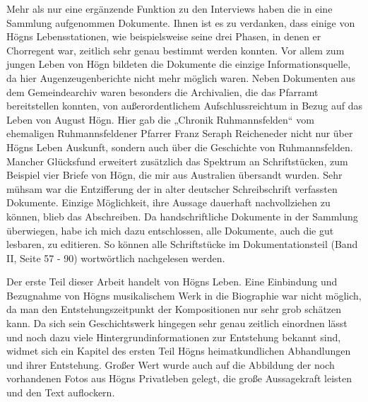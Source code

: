 \documentclass[a4paper]{article}
\newcounter{Abb}
\begin{document}
Mehr als nur eine ergänzende Funktion zu den Interviews haben die in
eine Sammlung aufgenommen Dokumente. Ihnen ist es zu verdanken, dass
einige von Högns Lebensstationen, wie beispielsweise seine drei Phasen,
in denen er Chorregent war, zeitlich sehr genau bestimmt werden
konnten. Vor allem zum jungen Leben von Högn bildeten die Dokumente die
einzige Informationsquelle, da hier Augenzeugenberichte nicht mehr
möglich waren. Neben Dokumenten aus dem Gemeindearchiv waren besonders
die Archivalien, die das Pfarramt bereitstellen konnten, von
außerordentlichem Aufschlussreichtum in Bezug auf das Leben von August
Högn. Hier gab die „Chronik Ruhmannsfelden“ vom ehemaligen
Ruhmannsfeldener Pfarrer Franz Seraph Reicheneder nicht nur über Högns
Leben Auskunft, sondern auch über die Geschichte von Ruhmannsfelden.
Mancher Glücksfund erweitert zusätzlich das Spektrum an Schriftstücken,
zum Beispiel vier Briefe von Högn, die mir aus Australien übersandt
wurden. Sehr mühsam war die Entzifferung der in alter deutscher
Schreibschrift verfassten Dokumente. Einzige Möglichkeit, ihre Aussage
dauerhaft nachvollziehen zu können, blieb das Abschreiben. Da
handschriftliche Dokumente in der Sammlung überwiegen, habe ich mich
dazu entschlossen, alle Dokumente, auch die gut lesbaren, zu editieren.
So können alle Schriftstücke im Dokumentationsteil (Band II, Seite 57 -
90) wortwörtlich nachgelesen werden.

Der erste Teil dieser Arbeit handelt von Högns Leben. Eine Einbindung
und Bezugnahme von Högns musikalischem Werk in die Biographie war nicht
möglich, da man den Entstehungszeitpunkt der Kompositionen nur sehr
grob schätzen kann. Da sich sein Geschichtswerk hingegen sehr genau
zeitlich einordnen lässt und noch dazu viele Hintergrundinformationen
zur Entstehung bekannt sind, widmet sich ein Kapitel des ersten Teil
Högns heimatkundlichen Abhandlungen und ihrer Entstehung. Großer Wert
wurde auch auf die Abbildung der noch vorhandenen Fotos aus Högns
Privatleben gelegt, die große Aussagekraft leisten und den Text
auflockern.
\end{document}
